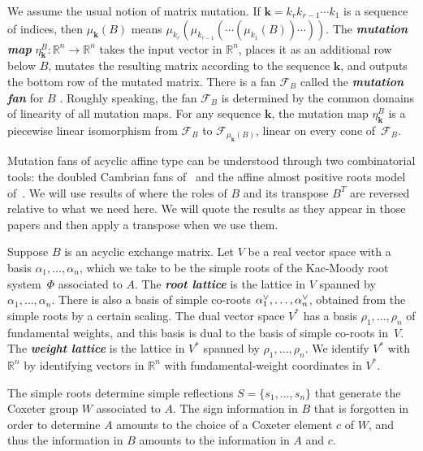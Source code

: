 \documentclass{amsart}
\theoremstyle{definition}
\theoremstyle{remark}
\numberwithin{equation}{section}
\newcommand{\newword}[1]{\textbf{\emph{#1}}}
\newcommand{\reals}{\mathbb R}
\newcommand{\set}[1]{{\lbrace #1 \rbrace}}
\newcommand{\F}{{\mathcal F}}
\newcommand{\ck}{\spcheck}
\newcommand{\0}{{\mathbf{0}}}
\newcommand{\kk}{{\boldsymbol{k}}}
\newcommand{\RSChar}{\Phi}
\newcommand{\RS}{\RSChar}
\begin{document}
We assume the usual notion of matrix mutation.
If ${\kk=k_rk_{r-1}\cdots k_1}$ is a sequence of indices, then $\mu_\kk(B)$ means $\mu_{k_r}(\mu_{k_{r-1}}(\cdots(\mu_{k_1}(B))\cdots))$.
The \newword{mutation map} ${\eta^B_\kk:\reals^n\to\reals^n}$ takes the input vector in $\reals^n$, places it as an additional row below $B$, mutates the resulting matrix according to the sequence $\kk$, and outputs the bottom row of the mutated matrix.
There is a fan $\F_B$ called the \newword{mutation fan} for $B$ \cite[Definition~5.12]{universal}.
Roughly speaking, the fan $\F_B$ is determined by the common domains of linearity of all mutation maps.
For any sequence $\kk$, the mutation map $\eta^B_\kk$ is a piecewise linear isomorphism from $\F_B$ to $\F_{\mu_\kk(B)}$, linear on every cone of~$\F_B$.

Mutation fans of acyclic affine type can be understood through two combinatorial tools: the doubled Cambrian fans of~\cite{afframe} and the affine almost positive roots model of~\cite{affdenom}.
We will use results of \cite{afframe,affdenom,affscat,affdomreg} where the roles of $B$ and its transpose $B^T$ are reversed relative to what we need here.
We will quote the results as they appear in those papers and then apply a transpose when we use them.

Suppose $B$ is an acyclic exchange matrix.
Let $V$ be a real vector space with a basis $\alpha_1,\ldots,\alpha_n$, which we take to be the simple roots of the Kac-Moody root system~$\RS$ associated to $A$.
The \newword{root lattice} is the lattice in $V$ spanned by $\alpha_1,\ldots,\alpha_n$.
There is also a basis of simple co-roots $\alpha\ck_1,\ldots,\alpha\ck_n$, obtained from the simple roots by a certain scaling.
The dual vector space $V^*$ has a basis $\rho_1,\ldots,\rho_n$ of fundamental weights, and this basis is dual to the basis of simple co-roots in~$V$. 
The \newword{weight lattice} is the lattice in $V^*$ spanned by $\rho_1,\ldots,\rho_n$.
We identify $V^*$ with $\reals^n$ by identifying vectors in $\reals^n$ with fundamental-weight coordinates in $V^*$.

The simple roots determine simple reflections $S=\set{s_1,\ldots,s_n}$ that generate the Coxeter group $W$ associated to $A$.
The sign information in $B$ that is forgotten in order to determine $A$ amounts to the choice of a Coxeter element $c$ of $W$, and thus the information in $B$ amounts to the information in $A$ and $c$.
\end{document}
